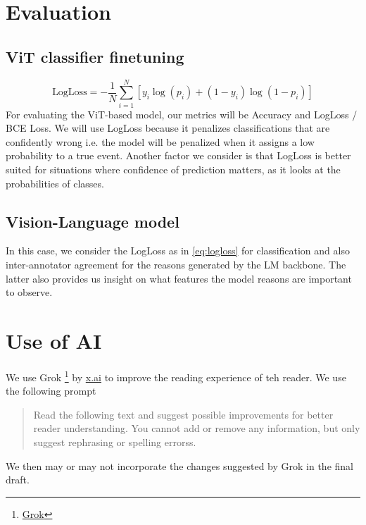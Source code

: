 \documentclass[10pt,twocolumn,letterpaper]{article}
\begin{document}
\section{Evaluation}

\subsection{ViT classifier finetuning}
\begin{equation}
\text{LogLoss} = - \frac{1}{N} \sum_{i=1}^{N}[y_{i}\log(p_i) + (1 - y_{i}) \log(1 - p_i)]
\label{eq:logloss}
\end{equation}
For evaluating the ViT-based model, our metrics will be Accuracy and LogLoss / BCE Loss. We will use LogLoss because it penalizes classifications that are confidently wrong i.e. the model will be penalized when it assigns a low probability to a true event. Another factor we consider is that LogLoss is better suited for situations where confidence of prediction matters, as it looks at the probabilities of classes.

\subsection{Vision-Language model}
In this case, we consider the LogLoss as in \ref{eq:logloss} for classification and also inter-annotator agreement for the reasons generated by the LM backbone. The latter also provides us insight on what features the model reasons are important to observe. 

\section*{Use of AI}
We use Grok \footnote{\href{www.grok.com}{Grok}} by \url{x.ai} to improve the reading experience of teh reader. We use the following prompt 

\begin{quote}
	Read the following text and suggest possible improvements for better reader understanding. You cannot add or remove any information, but only suggest rephrasing or spelling errorss.
\end{quote}

We then may or may not incorporate the changes suggested by Grok in the final draft.
{\small


}
\end{document}
